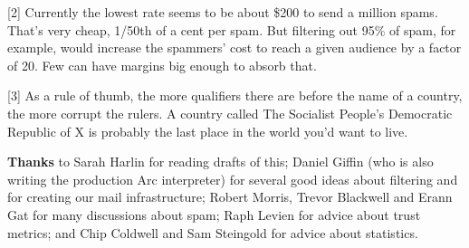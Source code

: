 {[}2{]} Currently the lowest rate seems to be about \$200 to send a
million spams. That's very cheap, 1/50th of a cent per spam. But
filtering out 95\% of spam, for example, would increase the spammers'
cost to reach a given audience by a factor of 20. Few can have margins
big enough to absorb that.

{[}3{]} As a rule of thumb, the more qualifiers there are before the
name of a country, the more corrupt the rulers. A country called The
Socialist People's Democratic Republic of X is probably the last place
in the world you'd want to live.

\textbf{Thanks} to Sarah Harlin for reading drafts of this; Daniel
Giffin (who is also writing the production Arc interpreter) for several
good ideas about filtering and for creating our mail infrastructure;
Robert Morris, Trevor Blackwell and Erann Gat for many discussions about
spam; Raph Levien for advice about trust metrics; and Chip Coldwell and
Sam Steingold for advice about statistics.
